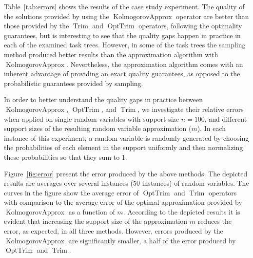 \documentclass{article}
\DeclareMathOperator{\Trim}{Trim}
\DeclareMathOperator{\KlmApprox}{KolmogorovApprox}
\DeclareMathOperator{\OptTrim}{OptTrim}
\begin{document}
Table~\ref{tab:errors} shows the results of the case study experiment. The quality of the solutions provided by using the $\KlmApprox$ operator are better than those provided by the $\Trim$ and $\OptTrim$ operators, following the optimality guarantees, but is interesting to see that the quality gaps happen in practice in each of the examined task trees. However, in some of the task trees the sampling method produced better results than the approximation algorithm with $\KlmApprox$. Nevertheless, the approximation algorithm comes with an inherent advantage of providing an exact quality guarantees, as opposed to the probabilistic guarantees provided by sampling.

In order to better understand the quality gaps in practice between $\KlmApprox$, $\OptTrim$, and $\Trim$, we investigate their relative errors when applied on single random variables with support size $n = 100$, and different support sizes of the resulting random variable approximation ($m$). In each instance of this experiment, a random variable is randomly generated by choosing the probabilities of each element in the support uniformly and then normalizing these probabilities so that they sum to 1.

Figure~\ref{fig:error} present the error produced by the above methods. The depicted results are averages over several instances (50 instances) of random variables. The curves in the figure show the average error of $\OptTrim$ and $\Trim$ operators with comparison to the average error of the optimal approximation provided by $\KlmApprox$ as a function of $m$. According to the depicted results it is evident that increasing the support size of the approximation $m$ reduces the error, as expected, in all three methods. However, errors produced by the $\KlmApprox$ are significantly smaller, a half of the error produced by $\OptTrim$ and $\Trim$.
\end{document}
